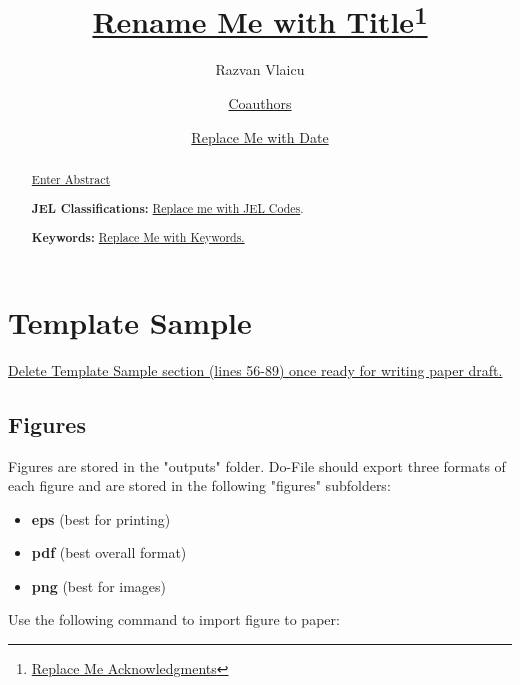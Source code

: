 \documentclass[12pt]{article}
\begin{document}
\title{\underline{Rename Me with Title}\thanks{\noindent \underline{Replace Me Acknowledgments}}}

\author{Razvan Vlaicu \and \underline{Coauthors}}

\date{\underline{Replace Me with Date}}

\maketitle

\begin{abstract}
\underline{Enter Abstract}

\bigskip

\noindent \textbf{JEL Classifications:} \underline{Replace me with JEL Codes}.

\noindent \textbf{Keywords:} \underline{ Replace Me with Keywords.}
\end{abstract}

\bigskip \pagebreak


\section{Template Sample}

\underline{Delete Template Sample section (lines 56-89) once ready for writing paper draft.}

\subsection{Figures}

Figures are stored in the "outputs" folder. Do-File should export three formats of each figure and are stored in the following "figures" subfolders:

\begin{itemize}
	\item \textbf{eps} (best for printing)
	\item \textbf{pdf} (best overall format)
	\item \textbf{png} (best for images)
\end{itemize}


Use the following command to import figure to paper: 
\end{document}

